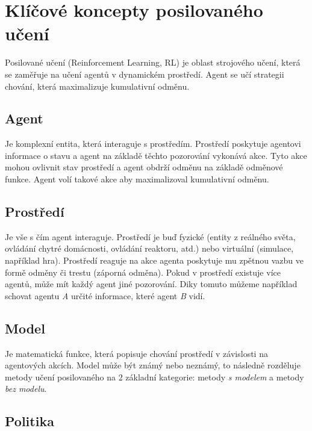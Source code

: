 \section{Klíčové koncepty posilovaného učení}\label{sec:klicove-koncepty-posilovaneho-uceni}
Posilované učení (Reinforcement Learning, RL) je oblast strojového učení, která se zaměřuje na učení agentů v dynamickém prostředí.
Agent se učí strategii chování, která maximalizuje kumulativní odměnu.

\subsection{Agent}\label{subsec:agent}

Je komplexní entita, která interaguje s prostředím.
Prostředí poskytuje agentovi informace o stavu a agent na základě těchto pozorování vykonává akce.
Tyto akce mohou ovlivnit stav prostředí a agent obdrží odměnu na základě odměnové funkce.
Agent volí takové akce aby maximalizoval kumulativní odměnu.

\subsection{Prostředí}\label{subsec:prostredi2}

Je vše s čím agent interaguje.
Prostředí je buď fyzické (entity z reálného světa, ovládání chytré domácnosti, ovládání reaktoru, atd.) nebo virtuální (simulace, například hra).
Prostředí reaguje na akce agenta poskytuje mu zpětnou vazbu ve formě odměny či trestu (záporná odměna).
Pokud v prostředí existuje více agentů, může mít každý agent jiné pozorování.
Diky tomuto můžeme například schovat agentu \textit{A} určité informace, které agent \textit{B} vidí.

\subsection{Model}\label{subsec:model}

Je matematická funkce, která popisuje chování prostředí v závislosti na agentových akcích.
Model může být známý nebo neznámý, to následně rozděluje metody učení posilovaného na 2 základní kategorie: metody \emph{s modelem} a metody \emph{ bez modelu}.


\subsection{Politika}\label{subsec:politika}

